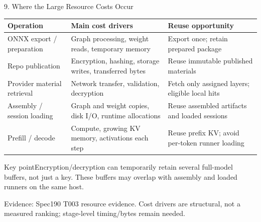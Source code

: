 \documentclass[10pt,aspectratio=169]{beamer}
\newcommand{\src}[1]{\vfill{\fontsize{6.5}{8}\selectfont\color{Gray}Evidence: #1\par}}
\newcommand{\point}[1]{\begin{block}{Key point}\small #1\end{block}}
\begin{document}
\begin{frame}{9. Where the Large Resource Costs Occur}
\small\renewcommand{\arraystretch}{1.05}
\begin{tabularx}{\linewidth}{@{}>{\raggedright\arraybackslash}p{34mm}YY@{}}
\toprule\textbf{Operation}&\textbf{Main cost drivers}&\textbf{Reuse opportunity}\\\midrule
ONNX export / preparation&Graph processing, weight reads, temporary memory&Export once; retain prepared package\\\midrule
Repo publication&Encryption, hashing, storage writes, transferred bytes&Reuse immutable published materials\\\midrule
Provider material retrieval&Network transfer, validation, decryption&Fetch only assigned layers; eligible local hits\\\midrule
Assembly / session loading&Graph and weight copies, disk I/O, runtime allocations&Reuse assembled artifacts and loaded sessions\\\midrule
Prefill / decode&Compute, growing KV memory, activations each step&Reuse prefix KV; avoid per-token runner loading\\\bottomrule
\end{tabularx}
\point{Encryption/decryption can temporarily retain several full-model buffers, not just a key. These buffers may overlap with assembly and loaded runners on the same host.}
\src{Spec190 T003 resource evidence. Cost drivers are structural, not a measured ranking; stage-level timing/bytes remain needed.}
\end{frame}
\end{document}
